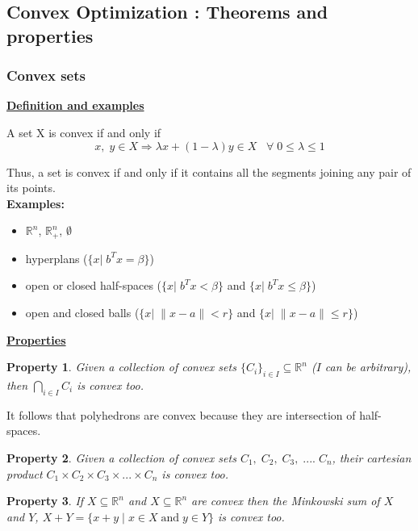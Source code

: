 \subsection{Convex Optimization : Theorems and properties}
\subsubsection{Convex sets}
\underline{\textbf{Definition and examples}}

\begin{mydef}
A set X is convex if and only if
$$x,\;y \in X \Rightarrow \lambda x +(1-\lambda )y \in X \;\;\; \forall \; 0 \le \lambda \le 1$$
\end{mydef}

Thus, a set is convex if and only if it contains all the segments joining any pair of its points. \\

\textbf{Examples:}
\begin{itemize}
\item $\mathbb{R}^n$, $\mathbb{R}^n_+$, $\emptyset$
\item hyperplans ($\{x|\; b^Tx=\beta\}$)
\item open or closed half-spaces ($\{x|\;b^Tx<\beta\}$ and $\{x| \;b^Tx\le \beta\}$)
\item open and closed balls ($\{x|\;\|x-a\|<r\}$ and $\{x|\;\|x-a\|\leq r \}$)
\end{itemize}

\underline{\textbf{Properties}}
\newtheorem{myproperty}{Property}
\begin{myproperty}
Given a collection of convex sets $\{C_i\}_{i \in I} \subseteq \mathbb{R}^n$ ($I$ can be arbitrary), then $\bigcap \limits _{i \in I}C_i$ is convex too.
\end{myproperty}
It follows that polyhedrons are convex because they are intersection of half-spaces.\\

\begin{myproperty}
Given a collection of convex sets $C_1,\; C_2,\; C_3,\; ....\;C_n$, their cartesian product $C_1\times C_2 \times C_3 \times ... \times C_n$ is convex too. 
\end{myproperty}

\begin{myproperty}
If $X\subseteq \mathbb{R}^n$ and $X\subseteq \mathbb{R}^n$ are convex then the Minkowski sum of $X$ and $Y$, $X+Y=\{x+y\;|\;x \in X \;\text{and} \; y \in Y\}$ is convex too. 
\end{myproperty}

